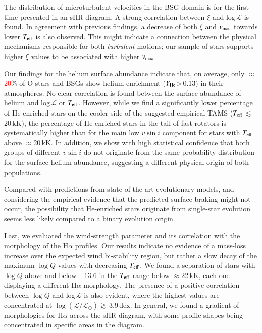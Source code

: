 \documentclass{aa}
\newcommand{\vsini}{\mbox{$v\sin i$}\xspace}
\newcommand{\vmac} {$v_{\rm mac}$\xspace}
\newcommand{\vmic}{$\xi$\xspace}
\newcommand{\Teff}{\mbox{$T_{\rm eff}$}\xspace}
\newcommand{\logQ}{\mbox{$\log Q$}\xspace}
\newcommand{\logLs}{$\log (\mathcal{L}/\mathcal{L}_{\odot})$\xspace}
\newcommand{\Ls}{$ \mathcal{L}$\xspace}
\newcommand{\He}{$Y_{\rm He}$\xspace}
\newcommand{\num}[1]{\textcolor{red}{#1}}
\newcommand{\ls}{\mbox{$\lesssim$}\,}
\newcommand{\gs}{\mbox{$\gtrsim$}\,}
\begin{document}
The distribution of microturbulent velocities in the BSG domain is for the first time presented in an sHR diagram. A strong correlation between \vmic and log\,\Ls is found. In agreement with previous findings, a decrease of both \vmic and \vmac towards lower \Teff is also observed. This might indicate a connection between the physical mechanisms responsible for both {\em turbulent} motions; our sample of stars supports higher \vmic values to be associated with higher \vmac. 

Our findings for the helium surface abundance indicate that, on average, only $\approx$\num{20}\% of O stars and BSGs show helium enrichment (\He>\,0.13) in their atmospheres. No clear correlation is found between the surface abundance of helium and log\,\Ls or \Teff. However, while we find a significantly lower percentage of He-enriched stars on the cooler side of the suggested empirical TAMS (\Teff\ls\,20\,kK), the percentage of He-enriched stars in the tail of fast rotators is systematically higher than for the main low \vsini component for stars with \Teff above $\approx$20\,kK. In addition, we show with high statistical confidence that both groups of different \vsini do not originate from the same probability distribution for the surface helium abundance, suggesting a different physical origin of both populations.

Compared with predictions from state-of-the-art evolutionary models, and considering the empirical evidence that the predicted surface braking might not occur, the possibility that He-enriched stars originate from single-star evolution seems less likely compared to a binary evolution origin.

Last, we evaluated the wind-strength parameter and its correlation with the morphology of the H$\alpha$ profiles. Our results indicate no evidence of a mass-loss increase over the expected wind bi-stability region, but rather a slow decay of the maximum \logQ values with decreasing \Teff. We found a separation of stars with \logQ above and below $-13.6$ in the \Teff range below $\approx$22\,kK, each one displaying a different H$\alpha$ morphology. 
The presence of a positive correlation between \logQ and log\,\Ls is also evident, where the highest values are concentrated at \logLs\gs3.9\,dex. 
In general, we found a gradient of morphologies for H$\alpha$ across the sHR diagram, with some profile shapes being concentrated in specific areas in the diagram.
\end{document}
